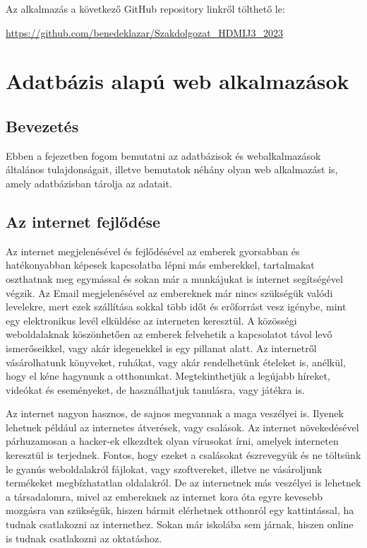 \documentclass[
]{thesis-ekf}
\theoremstyle{definition}
\theoremstyle{remark}
\begin{document}
\vspace{5mm}

Az alkalmazás a következő GitHub repository linkről tölthető le:


\url{ https://github.com/benedeklazar/Szakdolgozat_HDMIJ3_2023
}

\chapter{Adatbázis alapú web alkalmazások}
\section{Bevezetés}

Ebben a fejezetben fogom bemutatni az adatbázisok és webalkalmazások általános tulajdonságait, illetve bemutatok néhány olyan web alkalmazást is, amely adatbázisban tárolja az adatait. 

\section{Az internet fejlődése}

Az internet megjelenésével és fejlődésével az emberek gyorsabban és hatékonyabban képesek kapcsolatba lépni más emberekkel, tartalmakat oszthatnak meg egymással és sokan már a munkájukat is internet segítségével végzik. Az Email megjelenésével az embereknek már nincs szükségük valódi levelekre, mert ezek szállítása sokkal több időt és erőforrást vesz igénybe, mint egy elektronikus levél elküldése az interneten keresztül. A közösségi weboldalaknak köszönhetően az emberek felvehetik a kapcsolatot távol levő ismerőseikkel, vagy akár idegenekkel is egy pillanat alatt. Az internetről vásárolhatunk könyveket, ruhákat, vagy akár rendelhetünk ételeket is, anélkül, hogy el kéne hagynunk a otthonunkat. Megtekinthetjük a legújabb híreket, videókat és eseményeket, de használhatjuk tanulásra, vagy játékra is.

Az internet nagyon hasznos, de sajnos megvannak a maga veszélyei is. Ilyenek lehetnek például az internetes átverések, vagy csalások. Az internet növekedésével párhuzamosan a hacker-ek elkezdtek olyan vírusokat írni, amelyek interneten keresztül is terjednek. Fontos, hogy ezeket a csalásokat észrevegyük és ne töltsünk le gyanús weboldalakról fájlokat, vagy szoftvereket, illetve ne vásároljunk termékeket megbízhatatlan oldalakról. De az internetnek más veszélyei is lehetnek a társadalomra, mivel az embereknek az internet kora óta egyre kevesebb mozgásra van szükségük, hiszen bármit elérhetnek otthonról egy kattintással, ha tudnak csatlakozni az internethez. Sokan már iskolába sem járnak, hiszen online is tudnak csatlakozni az oktatáshoz.
\end{document}
